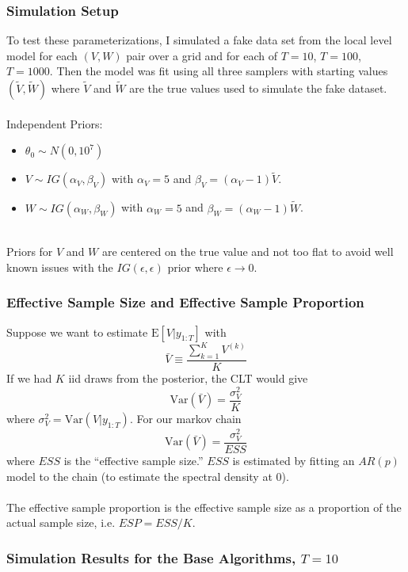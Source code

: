 \documentclass[xcolor=dvipsnames]{beamer}
\begin{document}
\begin{frame}
  \frametitle{Simulation Setup}

To test these parameterizations, I simulated a fake data set from the local level model for each $(V,W)$ pair over a grid and for each of $T=10$, $T=100$, $T=1000$. Then the model was fit using all three samplers with starting values $(\tilde{V},\tilde{W})$ where $\tilde{V}$ and $\tilde{W}$ are the true values used to simulate the fake dataset.\\~\\

Independent Priors:
\begin{itemize}
\item $\theta_0\sim N(0, 10^7)$
\item $V\sim IG(\alpha_V, \beta_V)$ with $\alpha_V=5$ and $\beta_V=(\alpha_V - 1)\tilde{V}$.
\item $W\sim IG(\alpha_W, \beta_W)$ with $\alpha_W=5$ and $\beta_W=(\alpha_W - 1)\tilde{W}$.\\~\\
\end{itemize}

Priors for $V$ and $W$ are centered on the true value and not too flat to avoid well known issues with the $IG(\epsilon, \epsilon)$ prior where $\epsilon\to0$.


\end{frame}

\begin{frame}
  \frametitle{Effective Sample Size and Effective Sample Proportion}
  Suppose we want to estimate $\mathrm{E}[V|y_{1:T}]$ with 
  \[
  \bar{V}\equiv\frac{\textstyle\sum_{k=1}^KV^{(k)}}{K}
  \]
  If we had $K$ iid draws from the posterior, the CLT would give 
  \[
  \mathrm{Var}(\bar{V})=\frac{\sigma_V^2}{K}
  \]
where $\sigma_V^2=\mathrm{Var}(V|y_{1:T})$. For our markov chain 
\[
\mathrm{Var}(\bar{V})=\frac{\sigma^2_V}{ESS}
\]
where $ESS$ is the ``effective sample size.'' $ESS$ is estimated by fitting an $AR(p)$ model to the chain (to estimate the spectral density at 0). \\~\\
  
  The effective sample proportion is the effective sample size as a proportion of the actual sample size, i.e. $ESP=ESS/K$.
\end{frame}

\begin{frame}
  \frametitle{Simulation Results for the Base Algorithms, $T=10$}
  
\end{frame}
\end{document}

